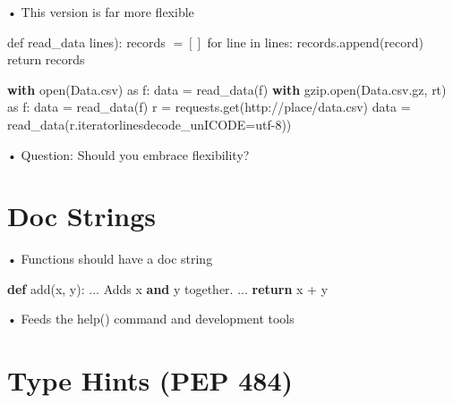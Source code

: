 \documentclass[
  letterpaper,
  DIV=11,
  numbers=noendperiod]{scrreprt}
\newenvironment{Shaded}{\begin{snugshade}}{\end{snugshade}}
\newcommand{\BuiltInTok}[1]{\textcolor[rgb]{0.00,0.23,0.31}{#1}}
\newcommand{\ControlFlowTok}[1]{\textcolor[rgb]{0.00,0.23,0.31}{\textbf{#1}}}
\newcommand{\ImportTok}[1]{\textcolor[rgb]{0.00,0.46,0.62}{#1}}
\newcommand{\KeywordTok}[1]{\textcolor[rgb]{0.00,0.23,0.31}{\textbf{#1}}}
\newcommand{\NormalTok}[1]{\textcolor[rgb]{0.00,0.23,0.31}{#1}}
\newcommand{\OperatorTok}[1]{\textcolor[rgb]{0.37,0.37,0.37}{#1}}
\newcommand{\StringTok}[1]{\textcolor[rgb]{0.13,0.47,0.30}{#1}}
\begin{document}
• This version is far more flexible

def read\_data lines): records \(= \left[\right]\) for line in lines:
records.append(record) return records

\begin{Shaded}
\begin{Highlighting}[]
\ControlFlowTok{with} \BuiltInTok{open}\NormalTok{(}\StringTok{\textquotesingle{}Data.csv\textquotesingle{}}\NormalTok{) }\ImportTok{as}\NormalTok{ f: data }\OperatorTok{=}\NormalTok{ read\_data(f)   }
\ControlFlowTok{with}\NormalTok{ gzip.}\BuiltInTok{open}\NormalTok{(}\StringTok{\textquotesingle{}Data.csv.gz\textquotesingle{}}\NormalTok{, }\StringTok{\textquotesingle{}rt\textquotesingle{}}\NormalTok{) }\ImportTok{as}\NormalTok{ f: data }\OperatorTok{=}\NormalTok{ read\_data(f)   }
\NormalTok{r }\OperatorTok{=}\NormalTok{ requests.get(}\StringTok{\textquotesingle{}http://place/data.csv\textquotesingle{}}\NormalTok{)   }
\NormalTok{data }\OperatorTok{=}\NormalTok{ read\_data(r.iteratorlinesdecode\_unICODE}\OperatorTok{=}\StringTok{\textquotesingle{}utf{-}8\textquotesingle{}}\NormalTok{)) }
\end{Highlighting}
\end{Shaded}

• Question: Should you embrace flexibility?


\chapter{Doc Strings}\label{doc-strings}

• Functions should have a doc string

\begin{Shaded}
\begin{Highlighting}[]
\KeywordTok{def}\NormalTok{ add(x, y):}
\NormalTok{    ...}
\NormalTok{    Adds x }\KeywordTok{and}\NormalTok{ y together.}
\NormalTok{    ...}
    \ControlFlowTok{return}\NormalTok{ x }\OperatorTok{+}\NormalTok{ y }
\end{Highlighting}
\end{Shaded}

• Feeds the help() command and development tools


\chapter{Type Hints (PEP 484)}\label{type-hints-pep-484}
\end{document}
